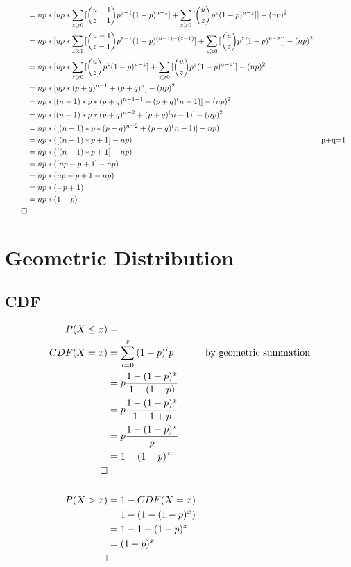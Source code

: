 \documentclass[]{book}
\begin{document}
\begin{align}
&= np*[up*\sum_{z \geqslant 0} {[\binom{u-1} {z-1} p^{z-1} (1-p)^{u-z}]} + \sum_{z \geqslant 0} {[\binom{u} {z} p^{z} (1-p)^{u-z}]}] - (np)^2\\
&= np*[up*\sum_{z \geqslant 1} {[\binom{u-1} {z-1} p^{z-1} (1-p)^{(u-1)-(z-1)}]} + \sum_{z \geqslant 0} {[\binom{u} {z} p^{z} (1-p)^{u-z}]}] - (np)^2\\
&= np*[up*\sum_{z \geqslant 0} {[\binom{u} {z} p^{z} (1-p)^{u-z}]} + \sum_{z \geqslant 0} {[\binom{u} {z} p^{z} (1-p)^{u-z}]}] - (np)^2\\
&= np*[up*(p+q)^{u-1} + (p+q)^u] - (np)^2\\
&= np*[(n-1)*p*(p+q)^{n-1-1}+(p+q)^(n-1)] -(np)^2\\
&= np*[(n-1)*p*(p+q)^{n-2}+(p+q)^(n-1)] - (np)^2\\
&= np*([(n-1)*p*(p+q)^{n-2}+(p+q)^(n-1)] - np)\\
&= np*([(n-1)*p+1] - np) && \text{p+q=1}\\
&= np*([(n-1)*p+1] - np)\\
&= np*([np-p +1] - np)\\
&= np*(np-p +1- np)\\
&= np*(-p +1)\\
&= np*(1-p)\\
\qed
\end{align}
 
\section {Geometric Distribution}

\subsection {CDF}

\begin{align*}
	P(X \le x) &=\\
	CDF(X=x) &= \sum_{i=0}^{x}{(1-p)^ip} &\text{by geometric summation}\\
	&= p\frac{1-(1-p)^x}{1-(1-p)}\\
	&= p\frac{1-(1-p)^x}{1-1+p}\\
	&= p\frac{1-(1-p)^x}{p}\\	
	&= 1-(1-p)^x\\	
	\qed\\
	\\
	P(X > x) &= 1 - CDF(X=x)\\
	&= 1 - (1-(1-p)^x)\\
	&= 1 - 1 +(1-p)^x\\	
	&= (1-p)^x\\	
	\qed
\end{align*}
\end{document}
